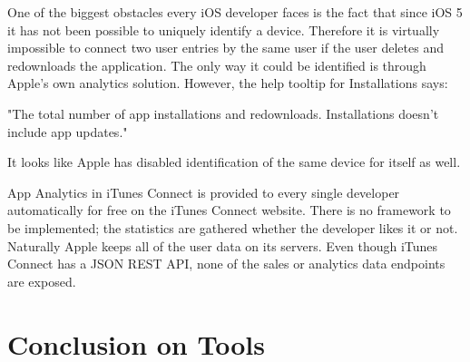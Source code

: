 One of the biggest obstacles every iOS developer faces is the fact that since iOS 5 \cite{udid} it has not been possible to uniquely identify a device. Therefore it is virtually impossible to connect two user entries by the same user if the user deletes and redownloads the application. The only way it could be identified is through Apple's own analytics solution. However, the help tooltip for Installations says:

\bigbreak

"The total number of app installations and redownloads. Installations doesn't include app updates."

\bigbreak

It looks like Apple has disabled identification of the same device for itself as well. 

App Analytics in iTunes Connect is provided to every single developer automatically for free on the iTunes Connect website. There is no framework to be implemented; the statistics are gathered whether the developer likes it or not. Naturally Apple keeps all of the user data on its servers. Even though iTunes Connect has a JSON REST API, none of the sales or analytics data endpoints are exposed.

\newpage

\section{Conclusion on Tools}

